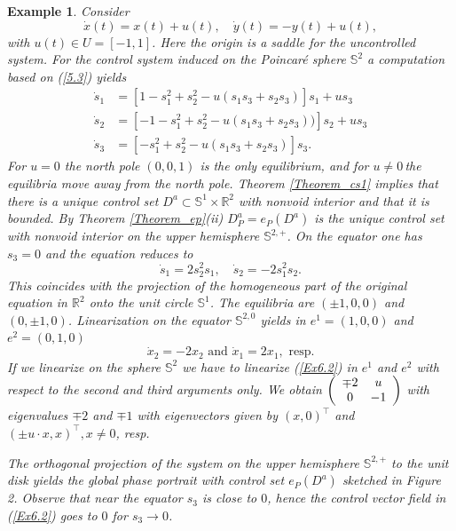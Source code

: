\documentclass{siamltex}%
\newtheorem{example}[theorem]{Example}
\begin{document}
\begin{example}
\label{Example6.2}Consider%
\begin{equation}
\dot{x}(t)=x(t)+u(t),\quad\dot{y}(t)=-y(t)+u(t), \label{Ex6.2b}%
\end{equation}
with $u(t)\in U=[-1,1]$. Here the origin is a saddle for the uncontrolled
system. For the control system induced on the Poincar\'{e} sphere
$\mathbb{S}^{2}$ a computation based on (\ref{5.3}) yields%
\begin{align}
\dot{s}_{1}  &  =\left[  1-s_{1}^{2}+s_{2}^{2}-u(s_{1}s_{3}+s_{2}%
s_{3})\right]  s_{1}+us_{3}\nonumber\\
\dot{s}_{2}  &  =\left[  -1-s_{1}^{2}+s_{2}^{2}-u(s_{1}s_{3}+s_{2}%
s_{3}))\right]  s_{2}+us_{3}\label{Ex6.2}\\
\dot{s}_{3}  &  =\left[  -s_{1}^{2}+s_{2}^{2}-u(s_{1}s_{3}+s_{2}s_{3})\right]
s_{3}.\nonumber
\end{align}
For $u=0$ the north pole $(0,0,1)$ is the only equilibrium, and for
$u\not =0\,$the equilibria move away from the north pole. Theorem
\ref{Theorem_cs1} implies that there is a unique control set $D^{a}%
\subset\mathbb{S}^{1}\times\mathbb{R}^{2}$ with nonvoid interior and that it
is bounded. By Theorem \ref{Theorem_ep}(ii) $D_{P}^{a}=e_{P}(D^{a})$ is the
unique control set with nonvoid interior on the upper hemisphere
$\mathbb{S}^{2,+}$. On the equator one has $s_{3}=0$ and the equation reduces
to%
\[
\dot{s}_{1}=2s_{2}^{2}s_{1},\quad\dot{s}_{2}=-2s_{1}^{2}s_{2}.
\]
This coincides with the projection of the homogeneous part of the original
equation in $\mathbb{R}^{2}$ onto the unit circle $\mathbb{S}^{1}$. The
equilibria are $(\pm1,0,0)$ and $(0,\pm1,0)$. Linearization on the equator
$\mathbb{S}^{2,0}$ yields in $e^{1}=(1,0,0)$ and $e^{2}=(0,1,0)$%
\[
\dot{x}_{2}=-2x_{2}\text{ and }\dot{x}_{1}=2x_{1},\text{ resp.}%
\]
If we linearize on the sphere $\mathbb{S}^{2}$ we have to linearize
(\ref{Ex6.2}) in $e^{1}$ and $e^{2}$ with respect to the second and third
arguments only. We obtain $\left(
\begin{array}
[c]{cc}%
\mp2 & u\\
0 & -1
\end{array}
\right)  $ with eigenvalues $\mp2$ and $\mp1$ with eigenvectors given by
$\left(  x,0\right)  ^{\top}$ and $\left(  \pm u\cdot x,x\right)  ^{\top
},\allowbreak x\not =0$, resp.

The orthogonal projection of the system on the upper hemisphere $\mathbb{S}%
^{2,+}$ to the unit disk yields the global phase portrait with control set
$e_{P}(D^{a})$ sketched in\textbf{ }Figure 2. Observe that near the equator
$s_{3}$ is close to $0$, hence the control vector field in (\ref{Ex6.2}) goes
to $0$ for $s_{3}\rightarrow0$.
\end{example}
\end{document}
